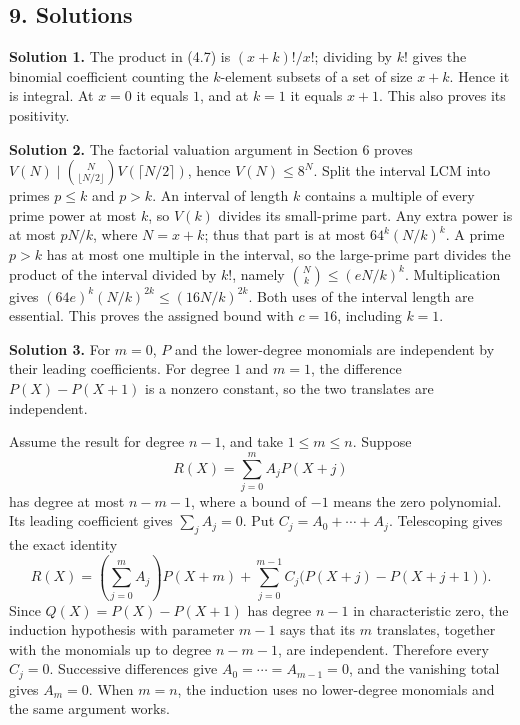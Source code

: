 \documentclass[
  11pt,
  a4paper,
]{article}
\begin{document}
\subsection{9. Solutions}\label{solutions}

\textbf{Solution 1.} The product in (4.7) is \((x+k)!/x!\); dividing by
\(k!\) gives the binomial coefficient counting the \(k\)-element subsets
of a set of size \(x+k\). Hence it is integral. At \(x=0\) it equals
\(1\), and at \(k=1\) it equals \(x+1\). This also proves its
positivity.

\textbf{Solution 2.} The factorial valuation argument in Section 6
proves \(V(N)\mid\binom N{\lfloor N/2\rfloor}V(\lceil N/2\rceil)\),
hence \(V(N)\le8^N\). Split the interval LCM into primes \(p\le k\) and
\(p>k\). An interval of length \(k\) contains a multiple of every prime
power at most \(k\), so \(V(k)\) divides its small-prime part. Any extra
power is at most \(pN/k\), where \(N=x+k\); thus that part is at most
\(64^k(N/k)^k\). A prime \(p>k\) has at most one multiple in the
interval, so the large-prime part divides the product of the interval
divided by \(k!\), namely \(\binom Nk\le(eN/k)^k\). Multiplication gives
\((64e)^k(N/k)^{2k}\le(16N/k)^{2k}\). Both uses of the interval length
are essential. This proves the assigned bound with \(c=16\), including
\(k=1\).

\textbf{Solution 3.} For \(m=0\), \(P\) and the lower-degree monomials
are independent by their leading coefficients. For degree \(1\) and
\(m=1\), the difference \(P(X)-P(X+1)\) is a nonzero constant, so the
two translates are independent.

Assume the result for degree \(n-1\), and take \(1\le m\le n\). Suppose
\[
R(X)=\sum_{j=0}^m A_jP(X+j)
\] has degree at most \(n-m-1\), where a bound of \(-1\) means the zero
polynomial. Its leading coefficient gives \(\sum_jA_j=0\). Put
\(C_j=A_0+\cdots+A_j\). Telescoping gives the exact identity \[
R(X)=\left(\sum_{j=0}^mA_j\right)P(X+m)
+\sum_{j=0}^{m-1}C_j\bigl(P(X+j)-P(X+j+1)\bigr).
\] Since \(Q(X)=P(X)-P(X+1)\) has degree \(n-1\) in characteristic zero,
the induction hypothesis with parameter \(m-1\) says that its \(m\)
translates, together with the monomials up to degree \(n-m-1\), are
independent. Therefore every \(C_j=0\). Successive differences give
\(A_0=\cdots=A_{m-1}=0\), and the vanishing total gives \(A_m=0\). When
\(m=n\), the induction uses no lower-degree monomials and the same
argument works.
\end{document}
